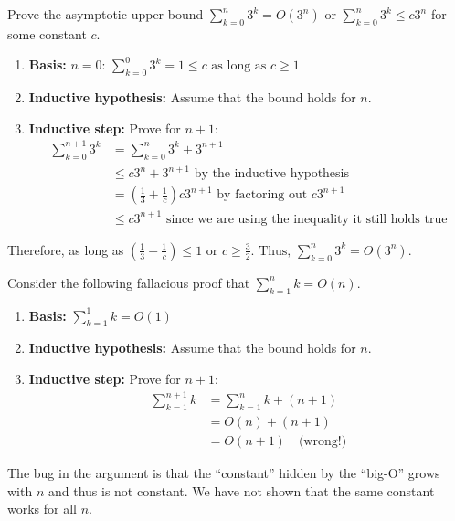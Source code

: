     \begin{example}
        Prove the asymptotic upper bound $\sum_{k=0}^{n} 3^k = O\left(3^n\right)$ or $\sum_{k=0}^{n} 3^k \leq c3^n$ for some constant $c$.
        \begin{enumerate}
            \item \textbf{Basis:} $n = 0 \text{: } \sum_{k=0}^{0} 3^k = 1 \leq c \text{ as long as } c \geq 1$
            \item \textbf{Inductive hypothesis:} Assume that the bound holds for $n$.
            \item \textbf{Inductive step:} Prove for $n+1$: 
            \begin{align*}
                \sum_{k=0}^{n+1} 3^k &= \sum_{k=0}^{n} 3^k + 3^{n+1} \\
                                    &\leq c3^n + 3^{n+1} \text{ by the inductive hypothesis} \\ 
                                    &= \left(\frac{1}{3} + \frac{1}{c}\right) c3^{n+1} \text{ by factoring out } c3^{n+1}\\
                                    &\leq c3^{n+1} \text{ since we are using the inequality it still holds true}
            \end{align*}
        \end{enumerate} 
        Therefore, as long as $\left(\frac{1}{3} + \frac{1}{c}\right) \leq 1 \text{ or } c \geq \frac{3}{2}. \text{ Thus, } \sum_{k=0}^{n} 3^k = O(3^n)$.
    \end{example}

    \begin{warning}
        Consider the following fallacious proof that \( \sum_{k=1}^n k = O(n) \). 
        \begin{enumerate}
            \item \textbf{Basis:} \( \sum_{k=1}^1 k = O(1) \) 
            \item \textbf{Inductive hypothesis:} Assume that the bound holds for \( n \).
            \item \textbf{Inductive step:} Prove for $n+1$:
            \begin{align*}
                \sum_{k=1}^{n+1} k &= \sum_{k=1}^{n} k + (n + 1) \\
                                    &= O(n) + (n + 1) \\
                                    &= O(n + 1) \quad \text{(wrong!)}
            \end{align*}
        \end{enumerate}

        The bug in the argument is that the “constant” hidden by the “big-O” grows with \( n \) and thus is not constant. We have not shown that the same constant works for all \( n \).
    \end{warning}

